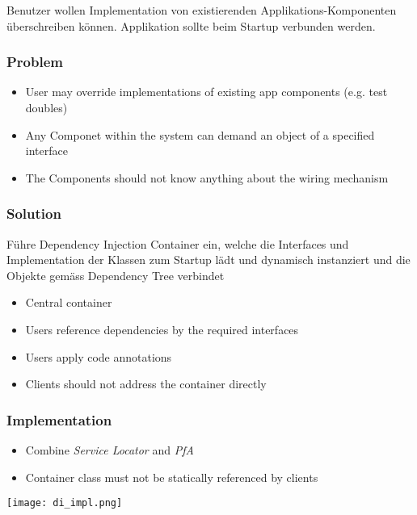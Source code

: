 Benutzer wollen Implementation von existierenden Applikations-Komponenten überschreiben können. Applikation sollte beim Startup verbunden werden.

\subsubsection{Problem}
\begin{itemize}
    \item User may override implementations of existing app components (e.g. test doubles)
    \item Any Componet within the system can demand an object of a specified interface
    \item The Components should not know anything about the wiring mechanism
\end{itemize}

\subsubsection{Solution}

Führe Dependency Injection Container ein, welche die Interfaces und Implementation der Klassen zum Startup lädt und dynamisch instanziert und die Objekte gemäss Dependency Tree verbindet

\begin{itemize}
    \item Central container
    \item Users reference dependencies by the required interfaces
    \item Users apply code annotations
    \item Clients should not address the container directly
\end{itemize}

\subsubsection{Implementation}
\begin{itemize}
    \item Combine \textit{Service Locator} and \textit{PfA}
    \item Container class must not be statically referenced by clients
\end{itemize}
\texttt{[image: di\_impl.png]}

